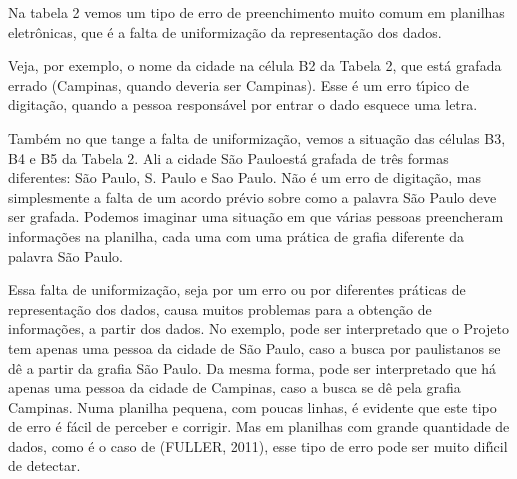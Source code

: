 \documentclass[
12pt,		%
openright,	%
twoside,  %
a4paper,			%
chapter=TITLE,		%
english,			%
french,				%
spanish,			%
brazil				%
]{USPSC-classe/USPSC}
\begin{document}
Na tabela 2 vemos um tipo de erro de preenchimento muito comum em planilhas eletr\^onicas, que \'e a falta de uniformiza\c{c}\~ao da representa\c{c}\~ao dos dados.









Veja, por exemplo, o nome da cidade na c\'elula B2 da Tabela 2, que est\'a grafada errado (Campinas, quando deveria ser Campinas). Esse \'e um erro t\'{\i}pico de digita\c{c}\~ao, quando a pessoa respons\'avel por entrar o dado esquece uma letra.









Tamb\'em no que tange a falta de uniformiza\c{c}\~ao, vemos a situa\c{c}\~ao das c\'elulas B3, B4 e B5 da Tabela 2. Ali a cidade \textquotedbl S\~ao Paulo\textquotedbl  est\'a grafada de tr\^es formas diferentes: S\~ao Paulo, S. Paulo e Sao Paulo. N\~ao \'e um erro de digita\c{c}\~ao, mas simplesmente a falta de um acordo pr\'evio sobre como a palavra S\~ao Paulo deve ser grafada. Podemos imaginar uma situa\c{c}\~ao em que v\'arias pessoas preencheram informa\c{c}\~oes na planilha, cada uma com uma pr\'atica de grafia diferente da palavra S\~ao Paulo.









Essa falta de uniformiza\c{c}\~ao, seja por um erro ou por diferentes pr\'aticas de representa\c{c}\~ao dos dados, causa muitos problemas para a obten\c{c}\~ao de informa\c{c}\~oes, a partir dos dados. No exemplo, pode ser interpretado que o Projeto tem apenas uma pessoa da cidade de S\~ao Paulo, caso a busca por paulistanos se d\^e a partir da grafia \textquotedbl S\~ao Paulo\textquotedbl . Da mesma forma, pode ser interpretado que h\'a apenas uma pessoa da cidade de Campinas, caso a busca se d\^e pela grafia \textquotedbl Campinas\textquotedbl . Numa planilha pequena, com poucas linhas, \'e evidente que este tipo de erro \'e f\'acil de perceber e corrigir. Mas em planilhas com grande quantidade de dados, como \'e o caso de (FULLER, 2011), esse tipo de erro pode ser muito dif\'{\i}cil de detectar.
\end{document}

